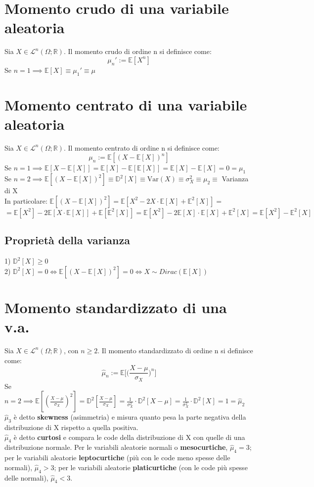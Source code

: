 \documentclass{article}
\begin{document}
\section*{Momento crudo di una variabile aleatoria}
Sia $X \in \mathcal{L}^{n}(\Omega; \mathbb{R})$. Il momento crudo di ordine n si definisce come:
\[ \mu_{n}' := \mathbb{E}[X^{n}] \]
Se $n=1 \implies \mathbb{E}[X] \equiv \mu_{1}' \equiv \mu$

\section*{Momento centrato di una variabile aleatoria}
Sia $X \in \mathcal{L}^{n}(\Omega; \mathbb{R})$. Il momento centrato di ordine n si definisce come:
\[ \mu_{n} := \mathbb{E}[(X - \mathbb{E}[X])^{n}] \]
Se $n=1 \implies \mathbb{E}[X - \mathbb{E}[X]] = \mathbb{E}[X] - \mathbb{E}[\mathbb{E}[X]] = \mathbb{E}[X] - \mathbb{E}[X] = 0 = \mu_{1}$\\
Se $n=2 \implies \mathbb{E}[(X - \mathbb{E}[X])^{2}] \equiv \mathbb{D}^{2}[X] \equiv \mbox{Var}(X) \equiv \sigma_{X}^{2} \equiv \mu_{2} \equiv$ Varianza di X\\
In particolare: $\mathbb{E}[(X - \mathbb{E}[X])^{2}] = \mathbb{E}[X^{2} - 2X\cdot \mathbb{E}[X] + \mathbb{E}^{2}[X]] =$\\
$= \mathbb{E}[X^{2}] - 2\mathbb{E}[X\cdot \mathbb{E}[X]] + \mathbb{E}[\mathbb{E}^{2}[X]] = \mathbb{E}[X^{2}] - 2\mathbb{E}[X]\cdot \mathbb{E}[X] + \mathbb{E}^{2}[X] = \mathbb{E}[X^{2}] - \mathbb{E}^{2}[X]$

\subsection*{Proprietà della varianza}
1) $\mathbb{D}^{2}[X] \geq 0$\\
2) $\mathbb{D}^{2}[X] = 0 \iff \mathbb{E}[(X - \mathbb{E}[X])^{2}] = 0 \iff X \sim Dirac(\mathbb{E}[X])$

\section*{Momento standardizzato di una v.a.}
Sia $X \in \mathcal{L}^{n}(\Omega; \mathbb{R})$, con $n \geq 2$. Il momento standardizzato di ordine n si definisce come:
\[ \hat{\mu}_{n} := \mathbb{E}\Big[ \Big( \frac{X-\mu}{\sigma_{X}}\Big)^{n}\Big] \]
Se $n=2 \implies \mathbb{E}[(\frac{X-\mu}{\sigma_{X}})^{2}] = \mathbb{D}^{2}[\frac{X-\mu}{\sigma_{X}}] = \frac{1}{\sigma_{X}^{2}}\cdot \mathbb{D}^{2}[X-\mu] = \frac{1}{\sigma_{X}^{2}}\cdot \mathbb{D}^{2}[X] = 1 = \hat{\mu}_{2}$\\
$\hat{\mu}_{3}$ è detto \textbf{skewness} (asimmetria) e misura quanto pesa la parte negativa della distribuzione di X rispetto a quella positiva.\\
$\hat{\mu}_{4}$ è detto \textbf{curtosi} e compara le code della distribuzione di X con quelle di una distribuzione normale. Per le variabili aleatorie normali o \textbf{mesocurtiche}, $\hat{\mu}_{4} = 3$; per le variabili aleatorie \textbf{leptocurtiche} (più con le code meno spesse delle normali), $\hat{\mu}_{4} > 3$; per le variabili aleatorie \textbf{platicurtiche} (con le code più spesse delle normali), $\hat{\mu}_{4} < 3$.
\end{document}
